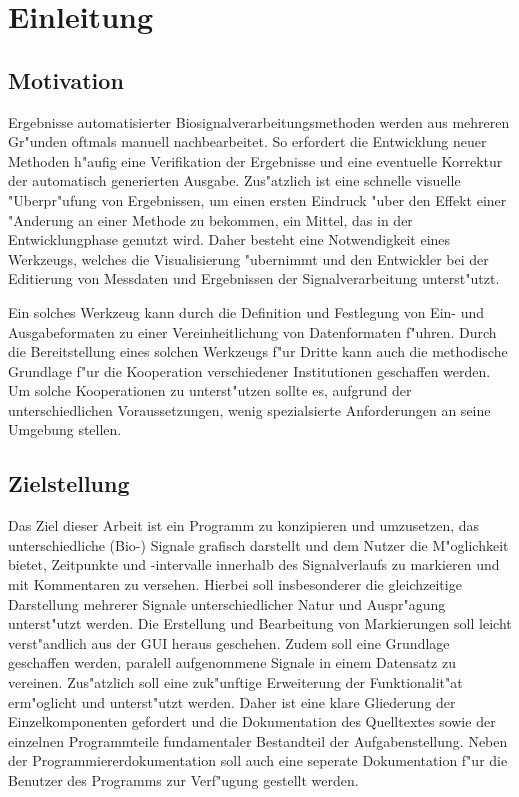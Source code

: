 \chapter{Einleitung}

\section{Motivation}

Ergebnisse automatisierter Biosignalverarbeitungsmethoden werden aus mehreren Gr"unden oftmals manuell nachbearbeitet.
So erfordert die Entwicklung neuer Methoden h"aufig eine Verifikation der Ergebnisse und eine eventuelle Korrektur der automatisch generierten Ausgabe.
Zus"atzlich ist eine schnelle visuelle "Uberpr"ufung von Ergebnissen, um einen ersten Eindruck "uber den Effekt einer "Anderung an einer Methode zu bekommen, ein Mittel, das in der Entwicklungphase genutzt wird.
Daher besteht eine Notwendigkeit eines Werkzeugs, welches die Visualisierung "ubernimmt und den Entwickler bei der Editierung von Messdaten und Ergebnissen der Signalverarbeitung unterst"utzt.

Ein solches Werkzeug kann durch die Definition und Festlegung von Ein- und Ausgabeformaten zu einer Vereinheitlichung von Datenformaten f"uhren.
Durch die Bereitstellung eines solchen Werkzeugs f"ur Dritte kann auch die methodische Grundlage f"ur die Kooperation verschiedener Institutionen geschaffen werden.
Um solche Kooperationen zu unterst"utzen sollte es, aufgrund der unterschiedlichen Voraussetzungen, wenig spezialsierte Anforderungen an seine Umgebung stellen.

\section{Zielstellung}

Das Ziel dieser Arbeit ist ein Programm zu konzipieren und umzusetzen, das unterschiedliche (Bio-) Signale grafisch darstellt und dem Nutzer die M"oglichkeit bietet, Zeitpunkte und -intervalle innerhalb des Signalverlaufs zu markieren und mit Kommentaren zu versehen.
Hierbei soll insbesonderer die gleichzeitige Darstellung mehrerer Signale unterschiedlicher Natur und Auspr"agung unterst"utzt werden.
Die Erstellung und Bearbeitung von Markierungen soll leicht verst"andlich aus der \ac{GUI} heraus geschehen.
Zudem soll eine Grundlage geschaffen werden, paralell aufgenommene Signale in einem Datensatz zu vereinen.
Zus"atzlich soll eine zuk"unftige Erweiterung der Funktionalit"at erm"oglicht und unterst"utzt werden.
Daher ist eine klare Gliederung der Einzelkomponenten gefordert und die Dokumentation des Quelltextes sowie der einzelnen Programmteile fundamentaler Bestandteil der Aufgabenstellung.
Neben der Programmiererdokumentation soll auch eine seperate Dokumentation f"ur die Benutzer des Programms zur Verf"ugung gestellt werden.

